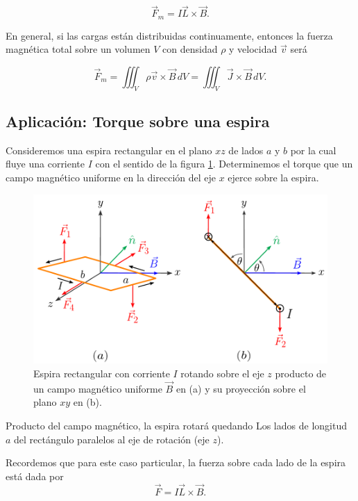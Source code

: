 \begin{equation*}
\vec{F}_m = I \vec{L} \times \vec{B}.
\end{equation*}

En general, si las cargas están distribuidas continuamente, entonces la fuerza magnética total sobre un volumen $V$ con densidad $\rho$ y velocidad $\Vec{v}$ será
 \begin{shaded}
 $$\vec{F}_m = \iiint_V \rho \Vec{v} \times \Vec{B} \,dV = \iiint_V  \Vec{J} \times \Vec{B} \,dV.$$    
 \end{shaded}

\subsection{Aplicación: Torque sobre una espira}

Consideremos una espira rectangular en el plano $xz$ de lados $a$ y $b$ por la cual fluye una corriente $I$ con el sentido de la figura \ref{fig:Espira}. Determinemos el torque que un campo magnético uniforme en la dirección del eje $x$ ejerce sobre la espira.

\begin{figure}[H]
    \centering
    \includegraphics[scale = 0.8]{Figuras/Espira.pdf}
    \caption{Espira rectangular con corriente $I$ rotando sobre el eje $z$ producto de un campo magnético uniforme $\Vec{B}$ en (a) y su proyección sobre el plano $xy$ en (b).}
    \label{fig:Espira}
\end{figure}

Producto del campo magnético, la espira rotará quedando Los lados de longitud $a$ del rectángulo paralelos al eje de rotación (eje $z$).

Recordemos que para este caso particular, la fuerza sobre cada lado de la espira está dada por
$$\vec{F} = I \vec{L} \times \vec{B}.$$


